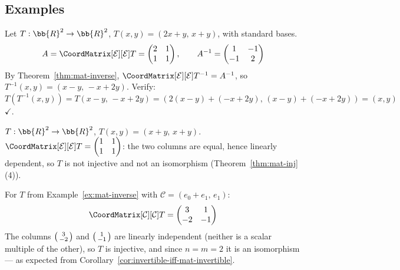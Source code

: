 \subsection{Examples}

\begin{example}
\label{ex:mat-inverse}
    Let $T: \bb{R}^2 \to \bb{R}^2$, $T(x,y) = (2x+y,\, x+y)$, with standard bases.
    \[
        A = \CoordMatrix[\mathcal{E}][\mathcal{E}]{T}
        = \begin{pmatrix} 2 & 1 \\ 1 & 1 \end{pmatrix},
        \qquad
        A^{-1} = \begin{pmatrix} 1 & -1 \\ -1 & 2 \end{pmatrix}
    \]
    By Theorem~\ref{thm:mat-inverse},
    $\CoordMatrix[\mathcal{E}][\mathcal{E}]{T^{-1}} = A^{-1}$, so
    $T^{-1}(x,y) = (x-y,\, -x+2y)$.
    Verify: $T(T^{-1}(x,y)) = T(x-y,\, -x+2y) = (2(x-y)+(-x+2y),\, (x-y)+(-x+2y))
    = (x, y)$ $\checkmark$.
\end{example}

\begin{example}
    $T: \bb{R}^2 \to \bb{R}^2$, $T(x,y) = (x+y,\, x+y)$.
    $\CoordMatrix[\mathcal{E}][\mathcal{E}]{T}
    = \begin{pmatrix}1&1\\1&1\end{pmatrix}$: the two columns are equal, hence linearly
    dependent, so $T$ is not injective and not an isomorphism
    (Theorem~\ref{thm:mat-inj}(4)).
\end{example}

\begin{example}
    For $T$ from Example~\ref{ex:mat-inverse} with $\mathcal{C} = (e_0+e_1,\, e_1)$:
    \[
        \CoordMatrix[\mathcal{C}][\mathcal{C}]{T}
        = \begin{pmatrix}3&1\\-2&-1\end{pmatrix}
    \]
    The columns $\begin{psmallmatrix}3\\-2\end{psmallmatrix}$ and
    $\begin{psmallmatrix}1\\-1\end{psmallmatrix}$ are linearly independent (neither is a
    scalar multiple of the other), so $T$ is injective, and since $n = m = 2$ it is an
    isomorphism --- as expected from Corollary~\ref{cor:invertible-iff-mat-invertible}.
\end{example}
